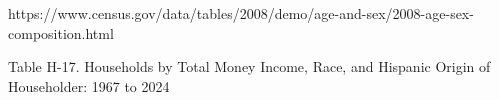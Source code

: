 
https://www.census.gov/data/tables/2008/demo/age-and-sex/2008-age-sex-composition.html 


Table H-17. Households by Total Money Income, Race, and Hispanic Origin of Householder: 1967 to 2024

